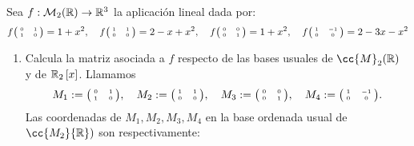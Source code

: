 \documentclass[12pt]{article}
\begin{document}
	\begin{ejercicio}[2.5 puntos] Sea $f : \mathcal{M}_2({\mathbb{R}}) \rightarrow {\mathbb{R}}^3$ la aplicación lineal dada por:
		\begin{equation*}
			f{\tiny \begin{pmatrix}
					\ 0 & 1 \ \\
					\ 1 & 0 \ \\
			\end{pmatrix}} = 1+x^2, \quad
			f{\tiny \begin{pmatrix}
					\ 1 & 1 \ \\
					\ 0 & 0 \ \\
			\end{pmatrix}} = 2-x+x^2, \quad	
			f{\tiny \begin{pmatrix}
					\ 0 & 0 \ \\
					\ 0 & 1 \ \\
			\end{pmatrix}} = 1+x^2, \quad
			f{\tiny \begin{pmatrix}
					\ 1 & -1 \ \\
					\ 0 & 0 \ \\
			\end{pmatrix}} =2-3x-x^2										
		\end{equation*}
		
		\begin{enumerate} 
			\item Calcula la matriz asociada a $f$ respecto de las bases usuales de $\cc{M}_2(\R)$ y de ${\mathbb{R}}_2\left[x\right]$.
			Llamamos 
			$$
			M_1 :={\tiny \begin{pmatrix}
					\ 0 & 1 \ \\
					\ 1 & 0 \ \\
			\end{pmatrix}},\quad
			M_2 :={\tiny \begin{pmatrix}
					\ 1 & 1 \ \\
					\ 0 & 0 \ \\
			\end{pmatrix}}, \quad	
			M_3 :={\tiny \begin{pmatrix}
					\ 0 & 0 \ \\
					\ 0 & 1 \ \\
			\end{pmatrix}}, \quad
			M_4 :={\tiny \begin{pmatrix}
					\ 1 & -1 \ \\
					\ 0 & 0 \ \\
			\end{pmatrix}}.
			$$
			Las coordenadas de $M_1, M_2, M_3, M_4$ en la base ordenada usual de $\cc{M_2}{\R})$ son respectivamente:
			

\end{enumerate}
\end{ejercicio}
\end{document}
